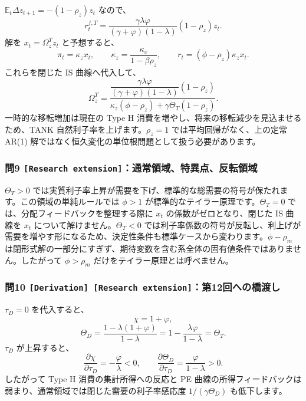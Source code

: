 \documentclass[
  japanese,
  lualatex,
  ja=standard,
  11pt,
  a4paper]{ltjsarticle}
\begin{document}
\(\mathbb E_t\Delta z_{t+1}=-(1-\rho_z)z_t\) なので、 \[
r_t^{f,T}
=\frac{\gamma\lambda\varphi}
{(\gamma+\varphi)(1-\lambda)}(1-\rho_z)z_t.
\] 解を \(x_t=\Omega_z^Tz_t\) と予想すると、 \[
\pi_t=\kappa_zx_t,
\qquad
\kappa_z=\frac{\kappa_x}{1-\beta\rho_z},
\qquad
r_t=(\phi-\rho_z)\kappa_zx_t.
\] これらを閉じた IS 曲線へ代入して、 \[
\Omega_z^T
=\frac{
\dfrac{\gamma\lambda\varphi}{(\gamma+\varphi)(1-\lambda)}(1-\rho_z)
}{
\kappa_z(\phi-\rho_z)+\gamma\Theta_T(1-\rho_z)
}.
\] 一時的な移転増加は現在の Type H
消費を増やし、将来の移転減少を見込ませるため、TANK
自然利子率を上げます。\(\rho_z=1\) では平均回帰がなく、上の定常 AR(1)
解ではなく恒久変化の単位根問題として扱う必要があります。

\subsubsection{\texorpdfstring{問9
\texttt{{[}Research\ extension{]}}：通常領域、特異点、反転領域}{問9 {[}Research extension{]}：通常領域、特異点、反転領域}}\label{ux554f9-research-extensionux901aux5e38ux9818ux57dfux7279ux7570ux70b9ux53cdux8ee2ux9818ux57df}

\(\Theta_T>0\)
では実質利子率上昇が需要を下げ、標準的な総需要の符号が保たれます。この領域の単純ルールでは
\(\phi>1\) が標準的なテイラー原理です。\(\Theta_T=0\)
では、分配フィードバックを整理する際に \(x_t\)
の係数がゼロとなり、閉じた IS 曲線を \(x_t\)
について解けません。\(\Theta_T<0\)
では利子率係数の符号が反転し、利上げが需要を増やす形になるため、決定性条件も標準ケースから変わります。\(\phi-\rho_m\)
は閉形式解の一部分にすぎず、期待変数を含む系全体の固有値条件ではありません。したがって
\(\phi>\rho_m\) だけをテイラー原理とは呼べません。

\subsubsection{\texorpdfstring{問10
\texttt{{[}Derivation{]}\ {[}Research\ extension{]}}：第12回への橋渡し}{問10 {[}Derivation{]} {[}Research extension{]}：第12回への橋渡し}}\label{ux554f10-derivation-research-extensionux7b2c12ux56deux3078ux306eux6a4bux6e21ux3057}

\(\tau_D=0\) を代入すると、 \[
\chi=1+\varphi,
\] \[
\Theta_D
=\frac{1-\lambda(1+\varphi)}{1-\lambda}
=1-\frac{\lambda\varphi}{1-\lambda}
=\Theta_T.
\] \(\tau_D\) が上昇すると、 \[
\frac{\partial\chi}{\partial\tau_D}=-\frac\varphi\lambda<0,
\qquad
\frac{\partial\Theta_D}{\partial\tau_D}=\frac\varphi{1-\lambda}>0.
\] したがって Type H 消費の集計所得への反応と PE
曲線の所得フィードバックは弱まり、通常領域では閉じた需要の利子率感応度
\(1/(\gamma\Theta_D)\) も低下します。
\end{document}
